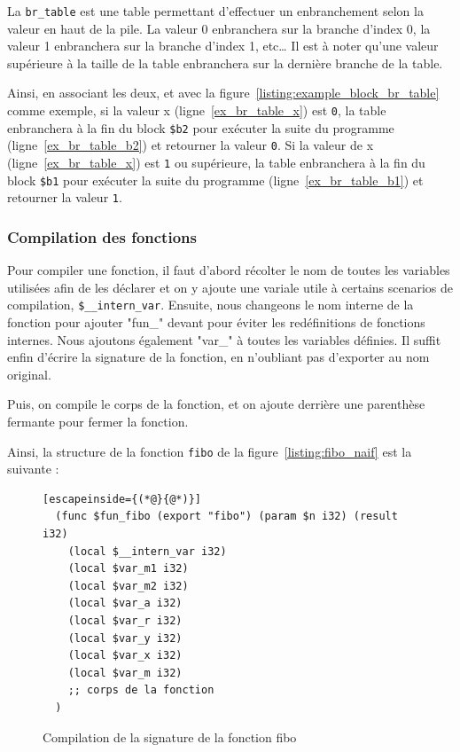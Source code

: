 \documentclass{rapportECL}
\begin{document}
La \verb|br_table| est une table permettant d'effectuer un enbranchement selon la valeur en haut de la pile.
La valeur 0 enbranchera sur la branche d'index 0, la valeur 1 enbranchera sur la branche d'index 1, etc\dots
Il est à noter qu'une valeur supérieure à la taille de la table enbranchera sur la dernière branche de la table.

Ainsi, en associant les deux, et avec la figure~\ref{listing:example_block_br_table} comme exemple, si la valeur x (ligne~\ref{ex_br_table_x})
est \verb|0|, la table enbranchera à la fin du block \verb|$b2| pour exécuter la suite du programme (ligne~\ref{ex_br_table_b2}) et 
retourner la valeur \verb|0|. Si la valeur de x (ligne~\ref{ex_br_table_x}) est \verb|1| ou supérieure, la table enbranchera à la fin du 
block \verb|$b1| pour exécuter la suite du programme (ligne~\ref{ex_br_table_b1}) et retourner la valeur \verb|1|.

\subsubsection{Compilation des fonctions}

Pour compiler une fonction, il faut d'abord récolter le nom de toutes les variables utilisées afin de les 
déclarer et on y ajoute une variale utile à certains scenarios de compilation, \verb|$__intern_var|.
Ensuite, nous changeons le nom interne de la fonction pour ajouter "fun\_" devant pour éviter les 
redéfinitions de fonctions internes.
Nous ajoutons également "var\_" à toutes les variables définies.
Il suffit enfin d'écrire la signature de la fonction, en n'oubliant pas d'exporter au nom original.

Puis, on compile le corps de la fonction, et on ajoute derrière une parenthèse fermante pour fermer la fonction.

Ainsi, la structure de la fonction \verb|fibo| de la figure~\ref*{listing:fibo_naif} est la suivante :
\begin{figure}[H]
	\begin{lstlisting}[escapeinside={(*@}{@*)}]
  (func $fun_fibo (export "fibo") (param $n i32) (result i32)
    (local $__intern_var i32)
    (local $var_m1 i32)
    (local $var_m2 i32)
    (local $var_a i32)
    (local $var_r i32)
    (local $var_y i32)
    (local $var_x i32)
    (local $var_m i32)
    ;; corps de la fonction
  )
	\end{lstlisting}
	\caption{Compilation de la signature de la fonction fibo}
	\label{listing:signature_fibo}
\end{figure}
\end{document}
